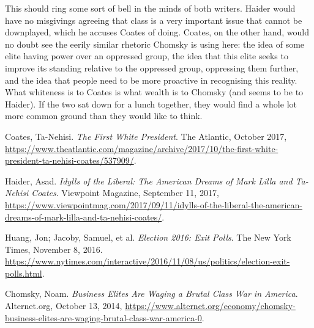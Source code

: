 This should ring some sort of bell in the minds of both writers. Haider would have no misgivings agreeing that class is a very important issue that cannot be downplayed, which he accuses Coates of doing. Coates, on the other hand, would no doubt see the eerily similar rhetoric Chomsky is using here: the idea of some elite having power over an oppressed group, the idea that this elite seeks to improve its standing relative to the oppressed group, oppressing them further, and the idea that people need to be more proactive in recognising this reality. What whiteness is to Coates is what wealth is to Chomsky (and seems to be to Haider). If the two sat down for a lunch together, they would find a whole lot more common ground than they would like to think.

\begin{thebibliography}{9}
Coates, Ta-Nehisi. \textit{The First White President}. The Atlantic, October 2017, \url{https://www.theatlantic.com/magazine/archive/2017/10/the-first-white-president-ta-nehisi-coates/537909/}.

Haider, Asad. \textit{Idylls of the Liberal: The American Dreams of Mark Lilla and Ta-Nehisi Coates}. Viewpoint Magazine, September 11, 2017, \url{https://www.viewpointmag.com/2017/09/11/idylls-of-the-liberal-the-american-dreams-of-mark-lilla-and-ta-nehisi-coates/}.

Huang, Jon; Jacoby, Samuel, et al. \textit{Election 2016: Exit Polls}. The New York Times, November 8, 2016.
\url{https://www.nytimes.com/interactive/2016/11/08/us/politics/election-exit-polls.html}.

Chomsky, Noam. \textit{Business Elites Are Waging a Brutal Class War in America}. Alternet.org, October 13, 2014, \url{https://www.alternet.org/economy/chomsky-business-elites-are-waging-brutal-class-war-america-0}.

\end{thebibliography}


